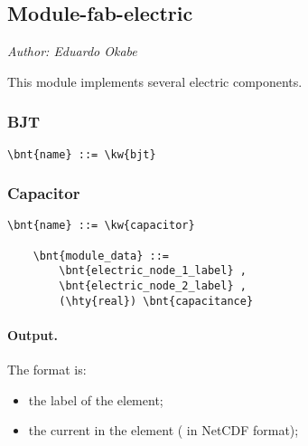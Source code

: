 % 
% 
% 
% 
% 
% 
% 
% 
% 


\subsection{Module-fab-electric}
\label{sec:MODULE:FAB-ELECTRIC}
\emph{Author: Eduardo Okabe}

\noindent
This module implements several electric components.


\subsubsection{BJT}
\begin{Verbatim}[commandchars=\\\{\}]
    \bnt{name} ::= \kw{bjt}
\end{Verbatim}


\subsubsection{Capacitor}
\begin{Verbatim}[commandchars=\\\{\}]
    \bnt{name} ::= \kw{capacitor}

    \bnt{module_data} ::=
        \bnt{electric_node_1_label} ,
        \bnt{electric_node_2_label} ,
        (\hty{real}) \bnt{capacitance}
\end{Verbatim}


\paragraph{Output.}
\label{sec:MODULE:FAB-ELECTRIC:CAPACITOR:OUTPUT}
The format is:
\begin{itemize}
\item the label of the element;
\item the current in the element ( in NetCDF format);
\end{itemize}


